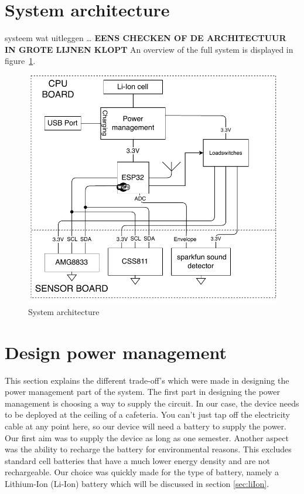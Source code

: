 \documentclass[11pt,a4paper]{article}
\begin{document}
\section{System architecture}
systeem wat uitleggen \dots
\textbf{EENS CHECKEN OF DE ARCHITECTUUR IN GROTE LIJNEN KLOPT}
An overview of the full system is displayed in figure~\ref{fig:architecture}.
\begin{figure}[H]
	\centering
	\includegraphics[width=1.0\linewidth]{architecture.pdf}
	\caption{System architecture}
	\label{fig:architecture}
\end{figure}


\section{Design power management}
This section explains the different trade-off's which were made in designing the power management part of the system. The first part in designing the power management is choosing a way to supply the circuit. In our case, the device needs to be deployed at the ceiling of a cafeteria. You can't just tap off the electricity cable at any point here, so our device will need a battery to supply the power. Our first aim was to supply the device as long as one semester. Another aspect was the ability to recharge the battery for environmental reasons. This excludes standard cell batteries that have a much lower energy density and are not rechargeable. Our choice was quickly made for the type of battery, namely a Lithium-Ion (Li-Ion) battery which will be discussed in section \ref{sec:liIon}.
\end{document}
